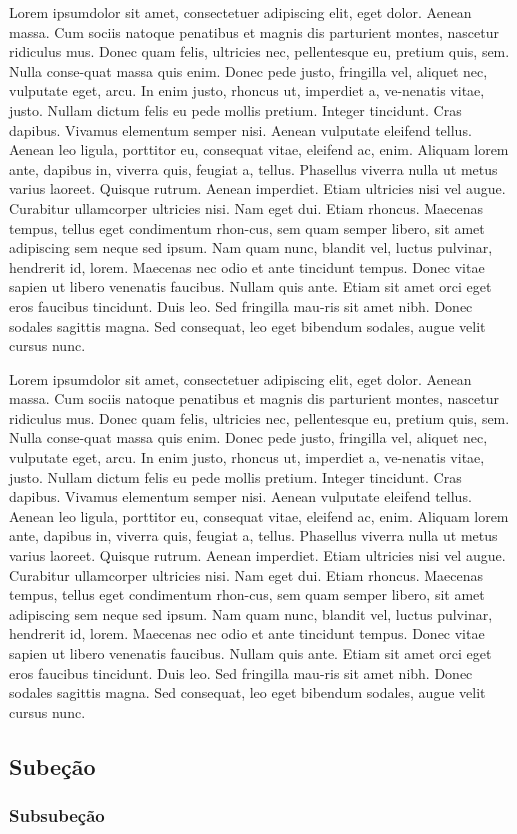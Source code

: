\documentclass{ufsc-thesis}
\begin{document}
Lorem ipsumdolor sit amet, consectetuer adipiscing elit, eget
dolor. Aenean massa. Cum sociis natoque penatibus et magnis
dis parturient montes, nascetur ridiculus mus. Donec quam felis,
ultricies nec, pellentesque eu, pretium quis, sem.
Nulla conse-quat massa quis enim. Donec pede justo, fringilla vel, aliquet nec,
vulputate eget, arcu. In enim justo, rhoncus ut, imperdiet a, ve-nenatis vitae,
justo. Nullam dictum felis eu pede mollis pretium.
Integer tincidunt. Cras dapibus. Vivamus elementum semper nisi.
Aenean vulputate eleifend tellus. Aenean leo ligula, porttitor eu,
consequat vitae, eleifend ac, enim. Aliquam lorem ante, dapibus
in, viverra quis, feugiat a, tellus. Phasellus viverra nulla ut metus
varius laoreet. Quisque rutrum. Aenean imperdiet. Etiam ultricies
nisi vel augue. Curabitur ullamcorper ultricies nisi. Nam eget dui.
Etiam rhoncus. Maecenas tempus, tellus eget condimentum rhon-cus, sem quam
semper libero, sit amet adipiscing sem neque sed ipsum. Nam quam nunc, blandit
vel, luctus pulvinar, hendrerit id, lorem. Maecenas nec odio et ante tincidunt
tempus. Donec vitae sapien ut libero venenatis faucibus. Nullam quis ante. Etiam
sit amet orci eget eros faucibus tincidunt. Duis leo. Sed fringilla mau-ris sit
amet nibh. Donec sodales sagittis magna. Sed consequat, leo eget bibendum
sodales, augue velit cursus nunc.

Lorem ipsumdolor sit amet, consectetuer adipiscing elit, eget
dolor. Aenean massa. Cum sociis natoque penatibus et magnis
dis parturient montes, nascetur ridiculus mus. Donec quam felis,
ultricies nec, pellentesque eu, pretium quis, sem.
Nulla conse-quat massa quis enim. Donec pede justo, fringilla vel, aliquet nec,
vulputate eget, arcu. In enim justo, rhoncus ut, imperdiet a, ve-nenatis vitae,
justo. Nullam dictum felis eu pede mollis pretium.
Integer tincidunt. Cras dapibus. Vivamus elementum semper nisi.
Aenean vulputate eleifend tellus. Aenean leo ligula, porttitor eu,
consequat vitae, eleifend ac, enim. Aliquam lorem ante, dapibus
in, viverra quis, feugiat a, tellus. Phasellus viverra nulla ut metus
varius laoreet. Quisque rutrum. Aenean imperdiet. Etiam ultricies
nisi vel augue. Curabitur ullamcorper ultricies nisi. Nam eget dui.
Etiam rhoncus. Maecenas tempus, tellus eget condimentum rhon-cus, sem quam
semper libero, sit amet adipiscing sem neque sed ipsum. Nam quam nunc, blandit
vel, luctus pulvinar, hendrerit id, lorem. Maecenas nec odio et ante tincidunt
tempus. Donec vitae sapien ut libero venenatis faucibus. Nullam quis ante. Etiam
sit amet orci eget eros faucibus tincidunt. Duis leo. Sed fringilla mau-ris sit
amet nibh. Donec sodales sagittis magna. Sed consequat, leo eget bibendum
sodales, augue velit cursus nunc.
\subsection{Subeção \\ \showfont}

\subsubsection{Subsubeção \\ \showfont}
\end{document}
